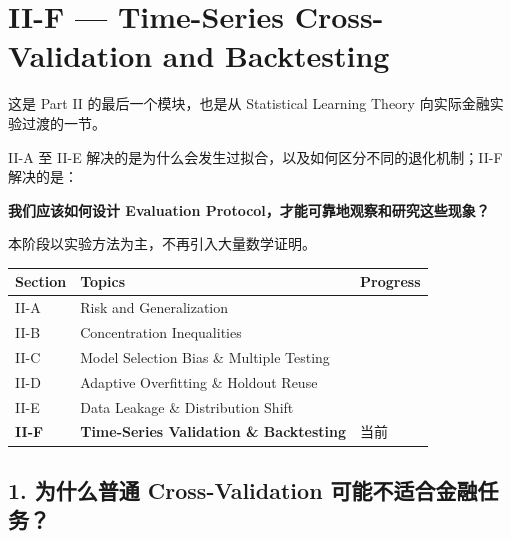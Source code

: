 \hypertarget{part-2-27-0001-ii-f-time-series-cross-validation-and-backtesting}{%
\section{II-F --- Time-Series Cross-Validation and Backtesting}\label{part-2-27-0001-ii-f-time-series-cross-validation-and-backtesting}}

这是 Part II 的最后一个模块，也是从 Statistical Learning Theory 向实际金融实验过渡的一节。

II-A 至 II-E 解决的是为什么会发生过拟合，以及如何区分不同的退化机制；II-F 解决的是：

\textbf{我们应该如何设计 Evaluation Protocol，才能可靠地观察和研究这些现象？}

本阶段以实验方法为主，不再引入大量数学证明。

\begin{readertable}
\begin{longtable}[]{@{}
  >{\raggedright\arraybackslash}p{}
  >{\raggedright\arraybackslash}p{}
  >{\raggedright\arraybackslash}p{}@{}}
\toprule
Section & Topics & Progress \\
\midrule
\endhead
II-A & Risk and Generalization & \\
II-B & Concentration Inequalities & \\
II-C & Model Selection Bias \& Multiple Testing & \\
II-D & Adaptive Overfitting \& Holdout Reuse & \\
II-E & Data Leakage \& Distribution Shift & \\
\textbf{II-F} & \textbf{Time-Series Validation \& Backtesting} & 当前 \\
\bottomrule
\end{longtable}
\end{readertable}

\hypertarget{part-2-27-0001-ux4e3aux4ec0ux4e48ux666eux901a-cross-validation-ux53efux80fdux4e0dux9002ux5408ux91d1ux878dux4efbux52a1}{%
\subsection{1. 为什么普通 Cross-Validation 可能不适合金融任务？}\label{part-2-27-0001-ux4e3aux4ec0ux4e48ux666eux901a-cross-validation-ux53efux80fdux4e0dux9002ux5408ux91d1ux878dux4efbux52a1}}

